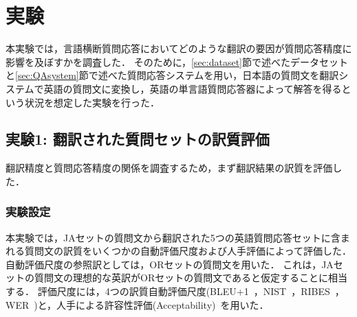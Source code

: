 \documentclass[japanese]{jnlp_1.4}
\begin{document}
\section{実験}
\label{sec:experiments}

本実験では，言語横断質問応答においてどのような翻訳の要因が質問応答精度に影響を及ぼすかを調査した．
そのために，\ref{sec:dataset}節で述べたデータセットと\ref{sec:QAsystem}節で述べた質問応答システムを用い，日本語の質問文を翻訳システムで英語の質問文に変換し，英語の単言語質問応答器によって解答を得るという状況を想定した実験を行った．


\subsection{実験1: 翻訳された質問セットの訳質評価}
\label{sec:MTevalexp}

翻訳精度と質問応答精度の関係を調査するため，まず翻訳結果の訳質を評価した．


\subsubsection{実験設定}
\label{sec:mt_criterion}

本実験では，JAセットの質問文から翻訳された5つの英語質問応答セットに含まれる質問文の訳質をいくつかの自動評価尺度および人手評価によって評価した．
自動評価尺度の参照訳としては，ORセットの質問文を用いた．
これは，JAセットの質問文の理想的な英訳がORセットの質問文であると仮定することに相当する．
評価尺度には，4つの訳質自動評価尺度(BLEU+1~\cite{bleu+1}，NIST~\cite{nist}，RIBES~\cite{ribes}，WER~\cite{wer})と，人手による許容性評価(Acceptability)~\cite{goto2013}を用いた．
\end{document}
